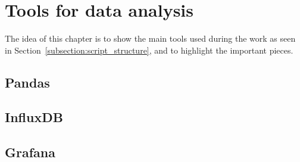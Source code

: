 \chapter{Tools for data analysis}
The idea of this chapter is to show the main tools used during the work as seen in Section~\ref{subsection:script_structure}, and to highlight the important pieces.

\section{Pandas}

\section{InfluxDB}

\section{Grafana}

